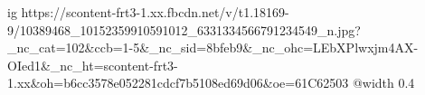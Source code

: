  
 
 
 
 

\ifcmt
  ig https://scontent-frt3-1.xx.fbcdn.net/v/t1.18169-9/10389468_10152359910591012_6331334566791234549_n.jpg?_nc_cat=102&ccb=1-5&_nc_sid=8bfeb9&_nc_ohc=LEbXPlwxjm4AX-OIed1&_nc_ht=scontent-frt3-1.xx&oh=b6cc3578e052281cdcf7b5108ed69d06&oe=61C62503
  @width 0.4
\fi
